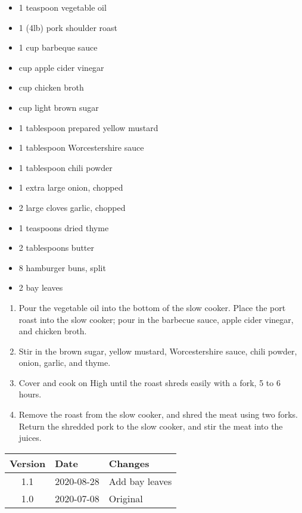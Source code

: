 \ingredients
\begin{multicols}{2}
\raggedcolumns 
\begin{itemize}
    \item 1 teaspoon vegetable oil
    \item 1 (4lb) pork shoulder roast
    \item 1 cup barbeque sauce
    \item {} cup apple cider vinegar
    \item {} cup chicken broth
    \item {} cup light brown sugar
    \item 1 tablespoon prepared yellow mustard
    \item 1 tablespoon Worcestershire sauce
    \item 1 tablespoon chili powder
    \item 1 extra large onion, chopped
    \item 2 large cloves garlic, chopped
    \item 1  teaspoons dried thyme
    \item 2 tablespoons butter
    \item 8 hamburger buns, split
    \item 2 bay leaves
\end{itemize}
\end{multicols}

\instructions
\begin{enumerate}
    \item Pour the vegetable oil into the bottom of the slow cooker. Place the port roast into the slow cooker; pour in the barbecue sauce, apple cider vinegar, and chicken broth. 
    \item Stir in the brown sugar, yellow mustard, Worcestershire sauce, chili powder, onion, garlic, and thyme.
    \item Cover and cook  on High until the roast shreds easily with a fork, 5 to 6 hours.
    \item Remove the roast from the slow cooker, and shred the meat using two forks. Return the shredded pork to the slow cooker, and stir the meat into the juices. 
\end{enumerate}

\vfill

\begin{tabular}{ c | l | l }
  \textbf{Version} & \textbf{Date} & \textbf{Changes} \\ 
  \hline		
  1.1 & 2020-08-28 & Add bay leaves \\
  1.0 & 2020-07-08 & Original \\
\end{tabular}

